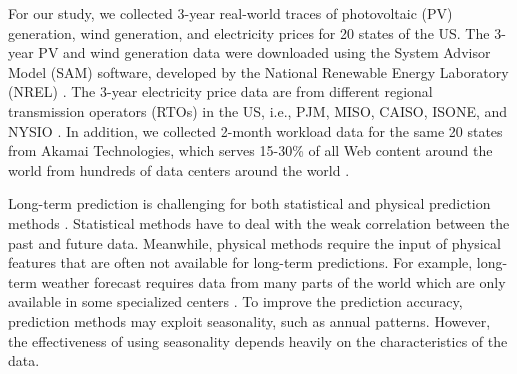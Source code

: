 For our study, we collected 3-year real-world traces of photovoltaic
(PV) generation, wind generation, and electricity prices for 20 states
of the US. The 3-year PV and wind generation data were downloaded
using the System Advisor Model (SAM) software, developed by the
National Renewable Energy Laboratory (NREL) \cite{nrel2010SAM}. The
3-year electricity price data are from different regional transmission
operators (RTOs) in the US, i.e., PJM, MISO, CAISO, ISONE, and NYSIO
\cite{qureshi2009cutting}. In addition, we collected 2-month workload
data for the same 20 states from Akamai Technologies, which serves
15-30\% of all Web content around the world from hundreds of data
centers around the world \cite{NygrenSS10}.


Long-term prediction is challenging for both statistical and physical
prediction methods \cite{lei2009review}. Statistical methods have to
deal with the weak correlation between the past and future
data. Meanwhile, physical methods require the input of physical
features that are often not available for long-term predictions. For
example, long-term weather forecast requires data from many parts of
the world which are only available in some specialized centers
{\cite{wmoLongTermForecasting}}. To improve the prediction accuracy,
prediction methods may exploit seasonality, such as annual
patterns. However, the effectiveness of using seasonality depends
heavily on the characteristics of the data.


